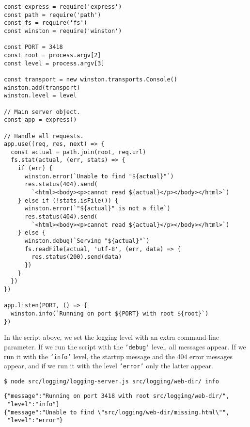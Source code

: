 \begin{verbatim}
const express = require('express')
const path = require('path')
const fs = require('fs')
const winston = require('winston')

const PORT = 3418
const root = process.argv[2]
const level = process.argv[3]

const transport = new winston.transports.Console()
winston.add(transport)
winston.level = level

// Main server object.
const app = express()

// Handle all requests.
app.use((req, res, next) => {
  const actual = path.join(root, req.url)
  fs.stat(actual, (err, stats) => {
    if (err) {
      winston.error(`Unable to find "${actual}"`)
      res.status(404).send(
        `<html><body><p>cannot read ${actual}</p></body></html>`)
    } else if (!stats.isFile()) {
      winston.error(`"${actual}" is not a file`)
      res.status(404).send(
        `<html><body><p>cannot read ${actual}</p></body></html>`)
    } else {
      winston.debug(`Serving "${actual}"`)
      fs.readFile(actual, 'utf-8', (err, data) => {
        res.status(200).send(data)
      })
    }
  })
})

app.listen(PORT, () => {
  winston.info(`Running on port ${PORT} with root ${root}`)
})
\end{verbatim}

In the script above,
we set the logging level with an extra command-line parameter.
If we run the script with the \texttt{'debug'} level, all messages appear.
If we run it with the \texttt{'info'} level,
the startup message and the 404 error messages appear,
and if we run it with the level \texttt{'error'} only the latter appear.

\begin{verbatim}
$ node src/logging/logging-server.js src/logging/web-dir/ info
\end{verbatim}

\begin{verbatim}
{"message":"Running on port 3418 with root src/logging/web-dir/",
 "level":"info"}
{"message":"Unable to find \"src/logging/web-dir/missing.html\"",
 "level":"error"}
\end{verbatim}
